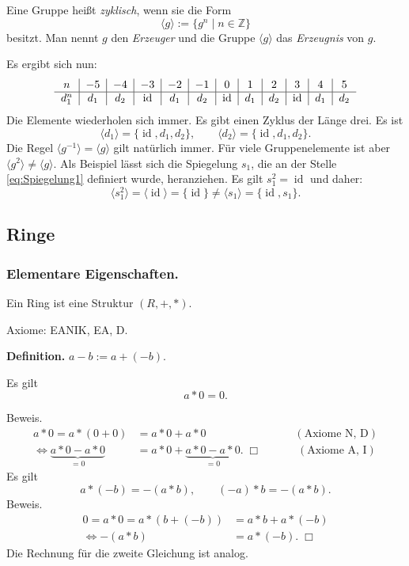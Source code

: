 \documentclass[a4paper,11pt,fleqn,twoside]{scrartcl}
\numberwithin{equation}{section}
\newcommand{\Z}{\mathbb Z}
\newcommand{\id}{\operatorname{id}}
\newcommand{\strong}[1]{{\normalfont\sffamily\bfseries #1}}
\newenvironment{Definition}{\par\noindent\strong{Definition.}}{\par}
\begin{document}
\begin{Definition}
Eine Gruppe heißt \emph{zyklisch}, wenn sie die Form
\begin{equation}
\langle g\rangle := \{g^n\mid n\in\Z\}
\end{equation}
besitzt. Man nennt $g$ den \emph{Erzeuger}
und die Gruppe $\langle g\rangle$ das \emph{Erzeugnis} von $g$.
\end{Definition}
Es ergibt sich nun:
\begin{equation}
\begin{tabular}{c|c|c|c|c|c|c|c|c|c|c|c}
$n$ & $-5$ & $-4$ & $-3$ & $-2$ & $-1$
& $0$ & $1$ & $2$ & $3$ & $4$ & $5$\\
\hline
$d_1^n$ & $d_1$ & $d_2$ & $\id$ & $d_1$ & $d_2$
& $\id$ & $d_1$ & $d_2$ & $\id$ & $d_1$ & $d_2$
\end{tabular}
\end{equation}
Die Elemente wiederholen sich immer. Es gibt einen Zyklus
der Länge drei. Es ist
\begin{equation}
\langle d_1\rangle = \{\id,d_1,d_2\},\qquad\langle d_2\rangle = \{\id,d_1,d_2\}.
\end{equation}
Die Regel $\langle g^{-1}\rangle = \langle g\rangle$ gilt natürlich
immer. Für viele Gruppenelemente ist aber
$\langle g^2\rangle\ne \langle g\rangle$. Als Beispiel lässt sich die
Spiegelung $s_1$, die an der Stelle \eqref{eq:Spiegelung1} definiert
wurde, heranziehen. Es gilt $s_1^2=\id$ und daher:
\begin{equation}
\langle s_1^2\rangle = \langle\id\rangle
= \{\id\} \ne \langle s_1\rangle = \{\id,s_1\}.
\end{equation}
\subsection{Ringe}
\subsubsection{Elementare Eigenschaften.}
Ein Ring ist eine Struktur $(R,+,*)$.

Axiome: EANIK, EA, D.

\strong{Definition.} $a-b:=a+(-b)$.

Es gilt
\begin{equation}
a*0=0.
\end{equation}

Beweis.
\begin{align}
a*0 = a*(0+0) &= a*0+a*0\qquad\qquad\qquad\qquad (\text{Axiome N, D})\\
\iff \underbrace{a*0-a*0}_{=0} &= a*0+\underbrace{a*0-a*0}_{=0}.\;\Box
\qquad\quad\; (\text{Axiome A, I})
\end{align}
Es gilt
\begin{equation}\label{eq:minus-minus-plus}
a*(-b) = -(a*b),\qquad (-a)*b = -(a*b).
\end{equation}
Beweis.
\begin{align}
0 = a*0 = a*(b+(-b)) &= a*b+a*(-b)\\
\iff  -(a*b) &= a*(-b).\;\Box
\end{align}
Die Rechnung für die zweite Gleichung ist analog.
\end{document}

